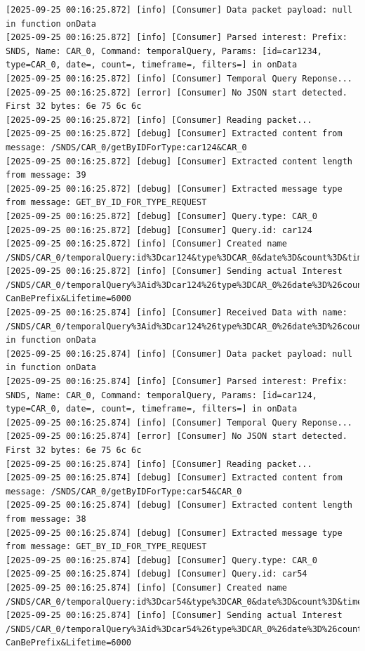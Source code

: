 \documentclass{article}
\begin{document}
\begin{lstlisting}[language=log, caption={D's log after receiving the registry payload, which are the \textit{@ids}, and performing a \emph{GET by ID} for each},label={lst:get-by-id-after-get-by-type-d}]
[2025-09-25 00:16:25.872] [info] [Consumer] Data packet payload: null in function onData
[2025-09-25 00:16:25.872] [info] [Consumer] Parsed interest: Prefix: SNDS, Name: CAR_0, Command: temporalQuery, Params: [id=car1234, type=CAR_0, date=, count=, timeframe=, filters=] in onData
[2025-09-25 00:16:25.872] [info] [Consumer] Temporal Query Reponse...
[2025-09-25 00:16:25.872] [error] [Consumer] No JSON start detected. First 32 bytes: 6e 75 6c 6c 
[2025-09-25 00:16:25.872] [info] [Consumer] Reading packet...
[2025-09-25 00:16:25.872] [debug] [Consumer] Extracted content from message: /SNDS/CAR_0/getByIDForType:car124&CAR_0
[2025-09-25 00:16:25.872] [debug] [Consumer] Extracted content length from message: 39
[2025-09-25 00:16:25.872] [debug] [Consumer] Extracted message type from message: GET_BY_ID_FOR_TYPE_REQUEST
[2025-09-25 00:16:25.872] [debug] [Consumer] Query.type: CAR_0
[2025-09-25 00:16:25.872] [debug] [Consumer] Query.id: car124
[2025-09-25 00:16:25.872] [info] [Consumer] Created name /SNDS/CAR_0/temporalQuery:id%3Dcar124&type%3DCAR_0&date%3D&count%3D&timeframe%3D&filters%3D
[2025-09-25 00:16:25.872] [info] [Consumer] Sending actual Interest /SNDS/CAR_0/temporalQuery%3Aid%3Dcar124%26type%3DCAR_0%26date%3D%26count%3D%26timeframe%3D%26filters%3D?CanBePrefix&Lifetime=6000
[2025-09-25 00:16:25.874] [info] [Consumer] Received Data with name: /SNDS/CAR_0/temporalQuery%3Aid%3Dcar124%26type%3DCAR_0%26date%3D%26count%3D%26timeframe%3D%26filters%3D in function onData
[2025-09-25 00:16:25.874] [info] [Consumer] Data packet payload: null in function onData
[2025-09-25 00:16:25.874] [info] [Consumer] Parsed interest: Prefix: SNDS, Name: CAR_0, Command: temporalQuery, Params: [id=car124, type=CAR_0, date=, count=, timeframe=, filters=] in onData
[2025-09-25 00:16:25.874] [info] [Consumer] Temporal Query Reponse...
[2025-09-25 00:16:25.874] [error] [Consumer] No JSON start detected. First 32 bytes: 6e 75 6c 6c 
[2025-09-25 00:16:25.874] [info] [Consumer] Reading packet...
[2025-09-25 00:16:25.874] [debug] [Consumer] Extracted content from message: /SNDS/CAR_0/getByIDForType:car54&CAR_0
[2025-09-25 00:16:25.874] [debug] [Consumer] Extracted content length from message: 38
[2025-09-25 00:16:25.874] [debug] [Consumer] Extracted message type from message: GET_BY_ID_FOR_TYPE_REQUEST
[2025-09-25 00:16:25.874] [debug] [Consumer] Query.type: CAR_0
[2025-09-25 00:16:25.874] [debug] [Consumer] Query.id: car54
[2025-09-25 00:16:25.874] [info] [Consumer] Created name /SNDS/CAR_0/temporalQuery:id%3Dcar54&type%3DCAR_0&date%3D&count%3D&timeframe%3D&filters%3D
[2025-09-25 00:16:25.874] [info] [Consumer] Sending actual Interest /SNDS/CAR_0/temporalQuery%3Aid%3Dcar54%26type%3DCAR_0%26date%3D%26count%3D%26timeframe%3D%26filters%3D?CanBePrefix&Lifetime=6000

\end{lstlisting}
\end{document}
